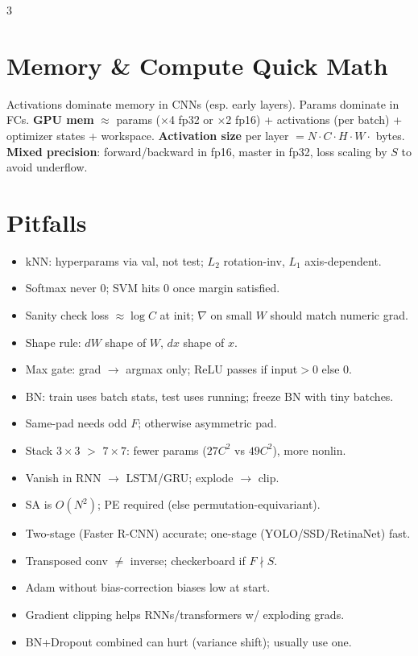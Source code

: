 \documentclass[a4paper,9pt,landscape]{scrartcl}
\begin{document}
\begin{multicols*}{3}
\section{Memory \& Compute Quick Math}
Activations dominate memory in CNNs (esp. early layers). Params dominate in FCs.
\textbf{GPU mem} $\approx$ params (×4 fp32 or ×2 fp16) + activations (per batch) + optimizer states + workspace.
\textbf{Activation size} per layer $=N\!\cdot\!C\!\cdot\!H\!\cdot\!W\!\cdot$ bytes.
\textbf{Mixed precision}: forward/backward in fp16, master in fp32, loss scaling by $S$ to avoid underflow.

\section{Pitfalls}
\begin{itemize}
\item kNN: hyperparams via val, not test; $L_2$ rotation-inv, $L_1$ axis-dependent.
\item Softmax never $0$; SVM hits $0$ once margin satisfied.
\item Sanity check loss $\approx \log C$ at init; $\nabla$ on small $W$ should match numeric grad.
\item Shape rule: $dW$ shape of $W$, $dx$ shape of $x$.
\item Max gate: grad $\to$ argmax only; ReLU passes if input$>0$ else $0$.
\item BN: train uses batch stats, test uses running; freeze BN with tiny batches.
\item Same-pad needs odd $F$; otherwise asymmetric pad.
\item Stack $3{\times}3$ $>$ $7{\times}7$: fewer params ($27C^2$ vs $49C^2$), more nonlin.
\item Vanish in RNN $\to$ LSTM/GRU; explode $\to$ clip.
\item SA is $O(N^2)$; PE required (else permutation-equivariant).
\item Two-stage (Faster R-CNN) accurate; one-stage (YOLO/SSD/RetinaNet) fast.
\item Transposed conv $\neq$ inverse; checkerboard if $F\!\nmid\!S$.
\item Adam without bias-correction biases low at start.
\item Gradient clipping helps RNNs/transformers w/ exploding grads.
\item BN+Dropout combined can hurt (variance shift); usually use one.
\end{itemize}

\end{multicols*}
\end{document}
